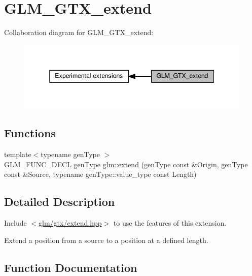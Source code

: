 \hypertarget{group__gtx__extend}{}\section{G\+L\+M\+\_\+\+G\+T\+X\+\_\+extend}
\label{group__gtx__extend}
Collaboration diagram for G\+L\+M\+\_\+\+G\+T\+X\+\_\+extend\+:
\nopagebreak
\begin{figure}[H]
\begin{center}
\leavevmode
\includegraphics[width=338pt]{d0/d45/group__gtx__extend}
\end{center}
\end{figure}
\subsection*{Functions}
\begin{DoxyCompactItemize}
\item 
{\footnotesize template$<$typename gen\+Type $>$ }\\G\+L\+M\+\_\+\+F\+U\+N\+C\+\_\+\+D\+E\+CL gen\+Type \hyperlink{group__gtx__extend_ga8140caae613b0f847ab0d7175dc03a37}{glm\+::extend} (gen\+Type const \&Origin, gen\+Type const \&Source, typename gen\+Type\+::value\+\_\+type const Length)
\end{DoxyCompactItemize}


\subsection{Detailed Description}
Include $<$\hyperlink{extend_8hpp}{glm/gtx/extend.\+hpp}$>$ to use the features of this extension.

Extend a position from a source to a position at a defined length. 

\subsection{Function Documentation}
\mbox{\label{group__gtx__extend_ga8140caae613b0f847ab0d7175dc03a37}} 
